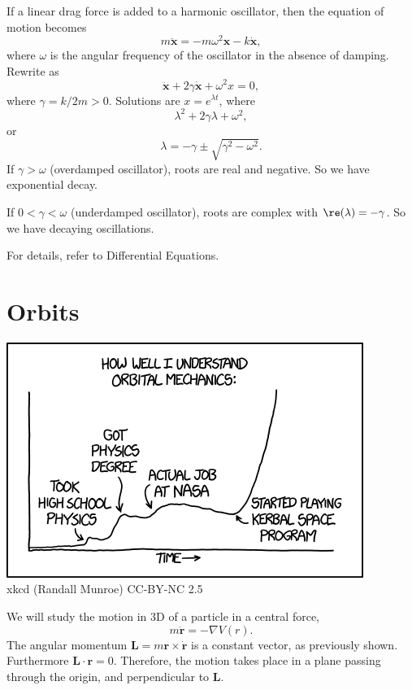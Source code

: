 \documentclass[a4paper]{article}
\begin{document}
\begin{eg}
  If a linear drag force is added to a harmonic oscillator, then the equation of motion becomes
  \[
    m\ddot{\mathbf{x}} = -m\omega^2 \mathbf{x} - k\dot{\mathbf{x}},
  \]
  where $\omega$ is the angular frequency of the oscillator in the absence of damping. Rewrite as
  \[
    \ddot{\mathbf{x}} + 2\gamma \dot{\mathbf{x}} + \omega^2 x = 0,
  \]
  where $\gamma = k/2m > 0$. Solutions are $x = e^{\lambda t}$, where
  \[
    \lambda^2 + 2\gamma \lambda + \omega^2,
  \]
  or
  \[
    \lambda = -\gamma \pm \sqrt{\gamma^2 - \omega^2}.
  \]
  If $\gamma > \omega$ (overdamped oscillator), roots are real and negative. So we have exponential decay.

  If $0 < \gamma < \omega$ (underdamped oscillator), roots are complex with $\re(\lambda) = -\gamma$. So we have decaying oscillations.

  For details, refer to Differential Equations.
\end{eg}

\section{Orbits}
\begin{center}
  \includegraphics[scale=.75]{images/xkcd_orbital_mechanics.png}\\
  xkcd (Randall Munroe) CC-BY-NC 2.5
\end{center}
We will study the motion in 3D of a particle in a central force,
\[
  m\ddot{\mathbf{r}} = -\nabla V(r).
\]
The angular momentum $\mathbf{L} = m\mathbf{r}\times \dot{\mathbf{r}}$ is a constant vector, as previously shown. Furthermore $\mathbf{L}\cdot \mathbf{r} = 0$. Therefore, the motion takes place in a plane passing through the origin, and perpendicular to $\mathbf{L}$.
\end{document}
